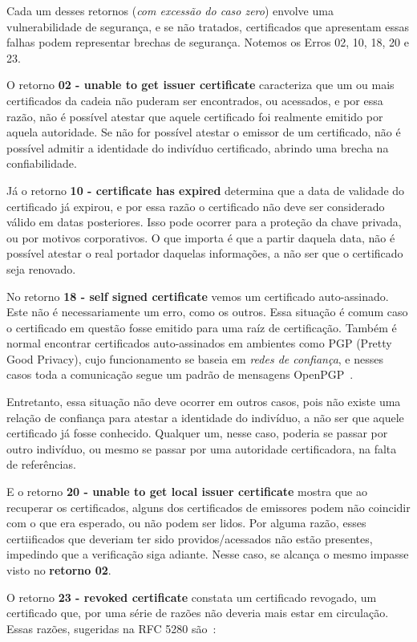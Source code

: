 	Cada um desses retornos (\textit{com excessão do caso zero}) envolve uma vulnerabilidade de segurança, e se não tratados, certificados que apresentam essas falhas podem representar brechas de segurança. Notemos os Erros 02, 10, 18, 20 e 23.

	O retorno \textbf{02 - unable to get issuer certificate} caracteriza que um ou mais certificados da cadeia não puderam ser encontrados, ou acessados, e por essa razão, não é possível atestar que aquele certificado foi realmente emitido por aquela autoridade. Se não for possível atestar o emissor de um certificado, não é possível admitir a identidade do indivíduo certificado, abrindo uma brecha na confiabilidade.

	Já o retorno \textbf{10 - certificate has expired} determina que a data de validade do certificado já expirou, e por essa razão o certificado não deve ser considerado válido em datas posteriores. Isso pode ocorrer para a proteção da chave privada, ou por motivos corporativos. O que importa é que a partir daquela data, não é possível atestar o real portador daquelas informações, a não ser que o certificado seja renovado.

	No retorno \textbf{18 - self signed certificate} vemos um certificado auto-assinado. Este não é necessariamente um erro, como os outros. Essa situação é comum caso o certificado em questão fosse emitido para uma raíz de certificação. Também é normal encontrar certificados auto-assinados em ambientes como PGP (Pretty Good Privacy), cujo funcionamento se baseia em \textit{redes de confiança}, e nesses casos toda a comunicação segue um padrão de mensagens OpenPGP~\cite{PGP}.

	Entretanto, essa situação não deve ocorrer em outros casos, pois não existe uma relação de confiança para atestar a identidade do indivíduo, a não ser que aquele certificado já fosse conhecido. Qualquer um, nesse caso, poderia se passar por outro indivíduo, ou mesmo se passar por uma autoridade certificadora, na falta de referências.

	E o retorno \textbf{20 - unable to get local issuer certificate} mostra que ao recuperar os certificados, alguns dos certificados de emissores podem não coincidir com o que era esperado, ou não podem ser lidos. Por alguma razão, esses certiificados que deveriam ter sido providos/acessados não estão presentes, impedindo que a verificação siga adiante.
	Nesse caso, se alcança o mesmo impasse visto no \textbf{retorno 02}.

	O retorno \textbf{23 - revoked certificate} constata um certificado revogado, um certificado que, por uma série de razões não deveria mais estar em circulação. Essas razões, sugeridas na RFC 5280 são~\cite[p.~90]{RFC5280}:

